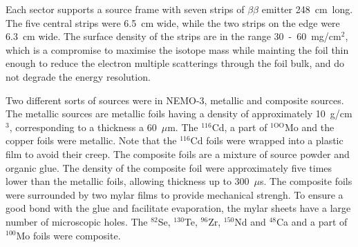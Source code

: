 \documentclass[main.tex]{subfiles}
\begin{document}
\NI Each sector supports a source frame with seven strips of $\beta\beta$ emitter 248~cm~long. The five central strips were  6.5~cm wide, while the two strips on the edge were 6.3~cm wide. The surface density of the strips are in the range 30~-~60~mg/cm$^\text{2}$, which is a compromise to maximise the isotope mass while mainting the foil thin enough to reduce the electron multiple scatterings through the foil bulk, and do not degrade the energy resolution.


\bigskip


\NI Two different sorts of sources were in NEMO-3, metallic and composite sources. The metallic sources are metallic foils having a density of approximately 10~g/cm$^\text{3}$, corresponding to a thickness a 60~$\mu$m. The $^{\text{116}}$Cd, a part of $^{\text{1OO}}$Mo and the copper foils were metallic. Note that the $^{\text{116}}$Cd foils were wrapped into a plastic film to avoid their creep. The composite foils are a mixture of source powder and organic glue. The density of the composite foil were approximately five times lower than the metallic foils, allowing thickness up to 300~$\mu$s. The composite foils were surrounded by two mylar films to provide mechanical strengh. To ensure a good bond with the glue and facilitate evaporation, the mylar sheets have a large number of microscopic holes. The $^{\text{82}}$Se, $^{\text{130}}$Te, $^{\text{96}}$Zr, $^{\text{150}}$Nd and $^{\text{48}}$Ca and a part of $^{\text{100}}$Mo foils were composite.



\end{document}
